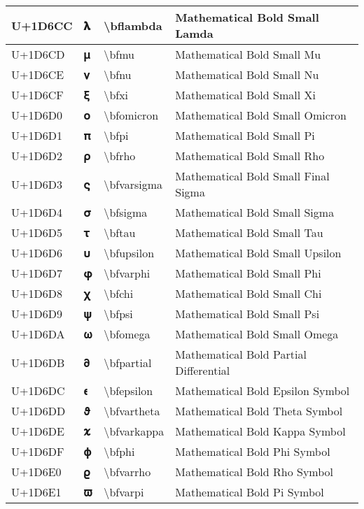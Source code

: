 \begin{table}[h]
\begin{tabulary}{\linewidth}{|L|L|L|L|}
\hline
U+1D6CC & 𝛌 & {\textbackslash}bflambda & Mathematical Bold Small Lamda \\
\hline
U+1D6CD & 𝛍 & {\textbackslash}bfmu & Mathematical Bold Small Mu \\
\hline
U+1D6CE & 𝛎 & {\textbackslash}bfnu & Mathematical Bold Small Nu \\
\hline
U+1D6CF & 𝛏 & {\textbackslash}bfxi & Mathematical Bold Small Xi \\
\hline
U+1D6D0 & 𝛐 & {\textbackslash}bfomicron & Mathematical Bold Small Omicron \\
\hline
U+1D6D1 & 𝛑 & {\textbackslash}bfpi & Mathematical Bold Small Pi \\
\hline
U+1D6D2 & 𝛒 & {\textbackslash}bfrho & Mathematical Bold Small Rho \\
\hline
U+1D6D3 & 𝛓 & {\textbackslash}bfvarsigma & Mathematical Bold Small Final Sigma \\
\hline
U+1D6D4 & 𝛔 & {\textbackslash}bfsigma & Mathematical Bold Small Sigma \\
\hline
U+1D6D5 & 𝛕 & {\textbackslash}bftau & Mathematical Bold Small Tau \\
\hline
U+1D6D6 & 𝛖 & {\textbackslash}bfupsilon & Mathematical Bold Small Upsilon \\
\hline
U+1D6D7 & 𝛗 & {\textbackslash}bfvarphi & Mathematical Bold Small Phi \\
\hline
U+1D6D8 & 𝛘 & {\textbackslash}bfchi & Mathematical Bold Small Chi \\
\hline
U+1D6D9 & 𝛙 & {\textbackslash}bfpsi & Mathematical Bold Small Psi \\
\hline
U+1D6DA & 𝛚 & {\textbackslash}bfomega & Mathematical Bold Small Omega \\
\hline
U+1D6DB & 𝛛 & {\textbackslash}bfpartial & Mathematical Bold Partial Differential \\
\hline
U+1D6DC & 𝛜 & {\textbackslash}bfepsilon & Mathematical Bold Epsilon Symbol \\
\hline
U+1D6DD & 𝛝 & {\textbackslash}bfvartheta & Mathematical Bold Theta Symbol \\
\hline
U+1D6DE & 𝛞 & {\textbackslash}bfvarkappa & Mathematical Bold Kappa Symbol \\
\hline
U+1D6DF & 𝛟 & {\textbackslash}bfphi & Mathematical Bold Phi Symbol \\
\hline
U+1D6E0 & 𝛠 & {\textbackslash}bfvarrho & Mathematical Bold Rho Symbol \\
\hline
U+1D6E1 & 𝛡 & {\textbackslash}bfvarpi & Mathematical Bold Pi Symbol \\

\end{tabulary}
\end{table}
